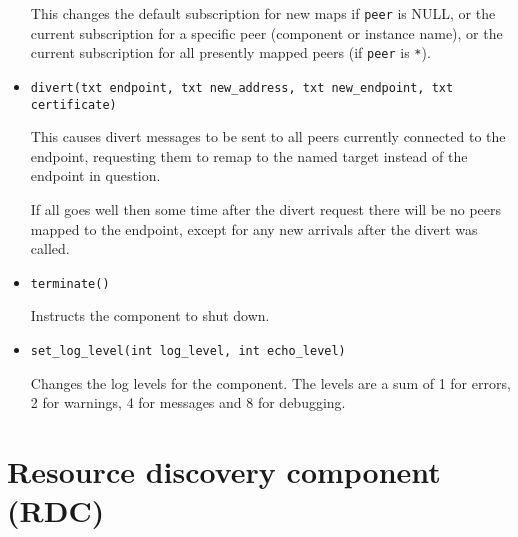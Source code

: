 \documentclass[12pt,a4paper,twoside]{article}
\renewcommand{\_}{\texttt{\symbol{95}}}
\begin{document}
\begin{itemize}
This changes the default subscription for new maps if \verb^peer^ is
NULL, or the current subscription for a specific peer (component or
instance name), or the current subscription for all presently mapped
peers (if \verb^peer^ is \verb^*^).

\item \verb^divert(txt endpoint, txt new_address, txt new_endpoint, txt certificate)^

This causes divert messages to be sent to all peers currently
connected to the endpoint, requesting them to remap to the
named target instead of the endpoint in question.

If all goes well then some time after the divert request there will be no
peers mapped to the endpoint, except for any new arrivals after
the divert was called.

\item \verb^terminate()^

Instructs the component to shut down.


\item \verb^set_log_level(int log_level, int echo_level)^

Changes the log levels for the component. The levels are a sum of
1 for errors, 2 for warnings, 4 for messages and 8 for debugging.


\end{itemize}

% 
% 
%
%
% 
% 

\newpage
\section{Resource discovery component (RDC)}
\label{rdc}
\end{document}
